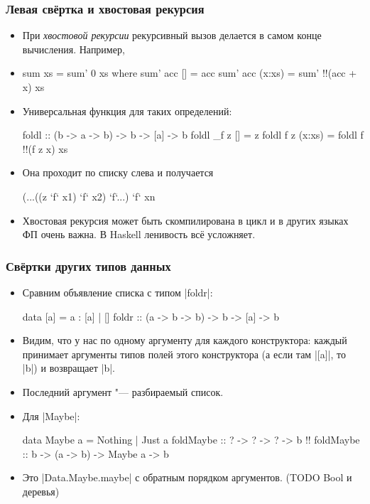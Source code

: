 \documentclass[11pt]{beamer}
\begin{document}
\begin{frame}[fragile]
  \frametitle{Левая свёртка и хвостовая рекурсия}
  \begin{itemize}
    \item При \emph{хвостовой рекурсии} рекурсивный вызов делается в самом конце вычисления. Например,
    \item \begin{haskellsmall}
            sum xs = sum' 0 xs where
              sum' acc [] = acc
              sum' acc (x:xs) = sum' !\pause!(acc + x) xs
          \end{haskellsmall}
    \item Универсальная функция для таких определений:
          \begin{haskellsmall}
            foldl :: (b -> a -> b) -> b -> [a] -> b
            foldl _f z [] = z
            foldl f z (x:xs) = foldl f !\pause!(f z x) xs
          \end{haskellsmall}
    \item Она проходит по списку слева и получается 
          \begin{haskellsmall}
            (...((z `f` x1) `f` x2) `f`...) `f` xn
          \end{haskellsmall}
    \item Хвостовая рекурсия может быть скомпилирована в цикл и в других языках ФП очень важна. В Haskell ленивость всё усложняет.
  \end{itemize}
\end{frame}

\begin{frame}[fragile]
  \frametitle{Свёртки других типов данных}
  \begin{itemize}
    \item Сравним объявление списка с типом \haskinline|foldr|:
          \begin{haskellsmall}
            data [a] = a : [a]       | []
            foldr ::  (a -> b -> b) -> b -> [a] -> b
          \end{haskellsmall}
    \item Видим, что у нас по одному аргументу для каждого конструктора: каждый принимает аргументы типов полей этого конструктора (а если там \haskinline|[a]|, то \haskinline|b|) и возвращает \haskinline|b|.
    \item Последний аргумент "--- разбираемый список.
    \item Для \haskinline|Maybe|:
          \begin{haskellsmall}
            data Maybe a = Nothing | Just a
            foldMaybe ::   ?      -> ?        -> ?       -> b !\pause!
            foldMaybe ::   b      -> (a -> b) -> Maybe a -> b
          \end{haskellsmall}
          \pause
    \item Это \haskinline|Data.Maybe.maybe| с обратным порядком аргументов. (TODO Bool и деревья)  %
  \end{itemize}
\end{frame}
\end{document}
